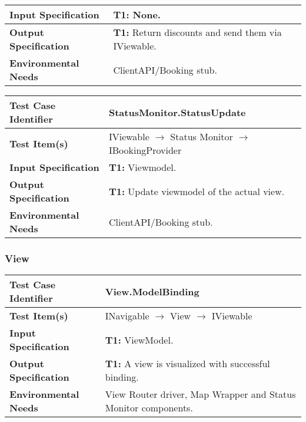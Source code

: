 {\begin{tabularx}{\textwidth}{l X}
    \textbf{Input Specification} & \textbf{T1:} None.\\
    \hline 
    
    \textbf{Output Specification} & \textbf{T1:} Return discounts and send them via IViewable.\\
    \hline 
    
    \textbf{Environmental Needs} & ClientAPI/Booking stub.\\
    \hline
\end{tabularx}
\bigskip 

\noindent
\begin{tabularx}{\textwidth}{l X}
    \hline 
    \textbf{Test Case Identifier} & StatusMonitor.StatusUpdate\\ 
    \hline 
    
    \textbf{Test Item(s)} & IViewable $\rightarrow$ Status Monitor $\rightarrow$ IBookingProvider\\
    \hline 
    
    \textbf{Input Specification} & \textbf{T1:} Viewmodel.\\
    \hline 
    
    \textbf{Output Specification} & \textbf{T1:} Update viewmodel of the actual view. \\
    \hline 
    
    \textbf{Environmental Needs} & ClientAPI/Booking stub.\\
    \hline
\end{tabularx}

\subsubsection{View}
\noindent
\begin{tabularx}{\textwidth}{l X}
    \hline 
    \textbf{Test Case Identifier} & View.ModelBinding\\ 
    \hline 
    
    \textbf{Test Item(s)} & INavigable $\rightarrow$ View $\rightarrow$ IViewable\\
    \hline 
    
    \textbf{Input Specification} & \textbf{T1:} ViewModel.\\
    \hline 
    
    \textbf{Output Specification} & \textbf{T1:} A view is visualized with successful binding.\\
    \hline 
    
    \textbf{Environmental Needs} & View Router driver, Map Wrapper and Status Monitor components.\\
    \hline
\end{tabularx}

}
